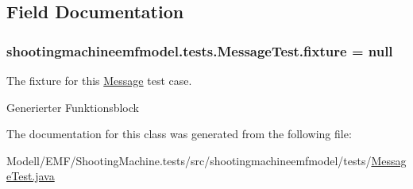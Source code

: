 \subsection{Field Documentation}
\hypertarget{classshootingmachineemfmodel_1_1tests_1_1_message_test_ae766ce61aedf47ee7183b0f96cc839fa}{
\subsubsection[{fixture}]{ shootingmachineemfmodel.\-tests.\-Message\-Test.\-fixture = null\hspace{0.3cm}{\ttfamily [protected]}}}\label{classshootingmachineemfmodel_1_1tests_1_1_message_test_ae766ce61aedf47ee7183b0f96cc839fa}
The fixture for this \hyperlink{interfaceshootingmachineemfmodel_1_1_message}{Message} test case.

Generierter Funktionsblock 

The documentation for this class was generated from the following file\-:\begin{DoxyCompactItemize}
\item 
Modell/\-E\-M\-F/\-Shooting\-Machine.\-tests/src/shootingmachineemfmodel/tests/\hyperlink{_message_test_8java}{Message\-Test.\-java}\end{DoxyCompactItemize}
